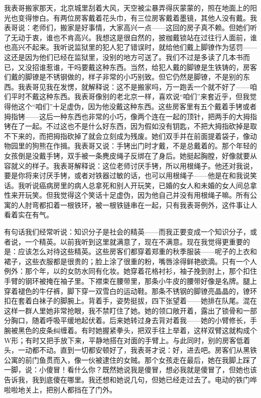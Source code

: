 我表哥搬家那天，北京城里刮着大风，天空被尘暴弄得灰蒙蒙的，照在地面上的阳光也变得惨白。有两位房客戴着花头巾，有三位房客戴着墨镜，其他人没有戴。我表哥说：老师们，搬家是好事情，大家高兴一点——这回的房子真不赖。但她们听了无动于衷，谁也不肯高兴。我想这是很自然的，披枷戴锁站在过往行人面前，谁也高兴不起来。我听说监狱里的犯人犯了错误时，就给他们戴上脚镣作为惩罚——这还是因为他们已经在监狱里，没别的地方可送了。我们不过是多读了几本书而已，又没招谁惹谁，干吗要戴这种东西。当然，给犯人戴的脚镣是生铁铸的，房客们戴的脚镣是不锈钢做的，样子非常的小巧别致。但它仍然是脚镣，不是别的东西。我表哥见我在发愣，就解释说：这不是搬家吗，万一跑丢一个就不好了——咱们平时不戴这种东西。我表哥像别的老北京一样，喜欢说“咱们”来套近乎，但我觉得他这个“咱们”十足虚伪，因为他没戴这种东西。这些房客里有五个戴着手铐或者拇指铐——这后一种东西也非常的小巧，像两个连在一起的顶针，把两手的大拇指铐在了一起。不过这也不是什么好东西，因为假如没有钥匙，不把大拇指砍掉是取不下来的，而把拇指砍掉了就会立刻成为残废。她们双手并在前面提着袋子，像动物园里的狗熊在作揖。我表哥又说：手铐出门时才戴，不是总戴着的。那个年轻的女孩倒是没戴手铐，双手被一条麂皮绳子反绑在了身后。她挺起胸膛，好像就要从容就义的样子。我表哥解释说：这位老师讨厌手铐，所以用根绳子。他还对我说，要是你将来讨厌手铐，或者对铁器过敏的话，也可以用根绳子——他是在和我说笑话。我听说癌病房里的病人总拿死和别人开玩笑，已婚的女人和未婚的女人间总拿性来开玩笑。但我觉得这个笑话十足虚伪，因为他自己并没有用根绳子嘛。所有公寓的人肘弯都扣着一根铁环，被一根铁链串在一起，只有我表哥例外，这件事让人看着实在有气。 



有句话我们经常听说：知识分子是社会的精英——而我正要变成一个知识分子，或者说，一个精英。以前我听到这里就满意了，现在不满意。现在我觉得更重要的是：应该怎么对待这些精英。这些房客们都穿着郑重的秋季服装——呢子的上衣和裙子，这些衣服都是很贵的；脸上涂了很重的粉，嘴唇涂得鲜艳欲滴。只有一个人例外：那个年，以的女防水同有化妆。她穿着花格衬衫，袖子挽到肘上，那个扣住手臂的钢环被掩在袖子里。下襟束在腰带里，那条小牛皮的腰带好像是名牌。腿上穿着褪色的牛仔裤，脚下穿一双雪白的运动鞋。那条不锈钢的脚镣亮晶晶的，镣环扣在套着白袜子的脚腕上。背着手，姿势挺拔，四下张望着——她排在队尾。混在这样一群人里她非常抢眼，我不禁盯住了她。她的领口敞开着，露出了锁骨和一部分胸口，随着呼吸平缓地起伏着。后来她转过身去背对着我——她的小臂修长，手腕被黑色的皮条纠缠着。有时她握紧拳头，把双手往上举着，这样双臂这就构成个W形；有时又把手放下来，平静地搭在对面的手臂上。与此同时，别的房客低着头，一动都不动。直到一切都安顿好了，我表哥才说：好，进去吧。房客们从黑铁公寓的前门鱼贯而入，像一伙被逮住的女贼。那个女孩走在最后，她在我脚上踩了一脚，说：小傻冒！看什么你？既然她说我是傻冒，想必我就是傻冒了，但她也该告诉我，我到底傻在哪里。我还想和她说几句，但她已经走过去了。电动的铁门哗啦啦地关上，把别人都挡在了门外。 



